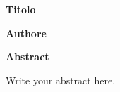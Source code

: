 \setcounter{page}{1} %
\vspace*{0.2\textheight}

\thispagestyle{plain}
\begin{center}
    \Large
    \textbf{Titolo}

    \vspace{0.4cm}
    \textbf{Authore}

    \vspace{0.9cm}
    \textbf{Abstract}
\end{center}
\newcommand\quo[1]{``#1''}
Write your abstract here.